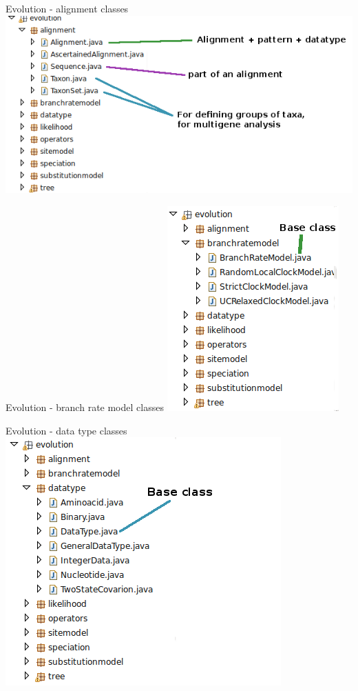\documentclass{beamer}
\theoremstyle{definition}
\begin{document}
\begin{frame}[containsverbatim]{Evolution - alignment classes}
\includegraphics[width=\textwidth]{classes6.png}
\end{frame}

\begin{frame}[containsverbatim]{Evolution - branch rate model classes}
\includegraphics{classes7.png}
\end{frame}

\begin{frame}[containsverbatim]{Evolution - data type classes}
\includegraphics[width=\textwidth]{classes8.png}
\end{frame}
\end{document}
